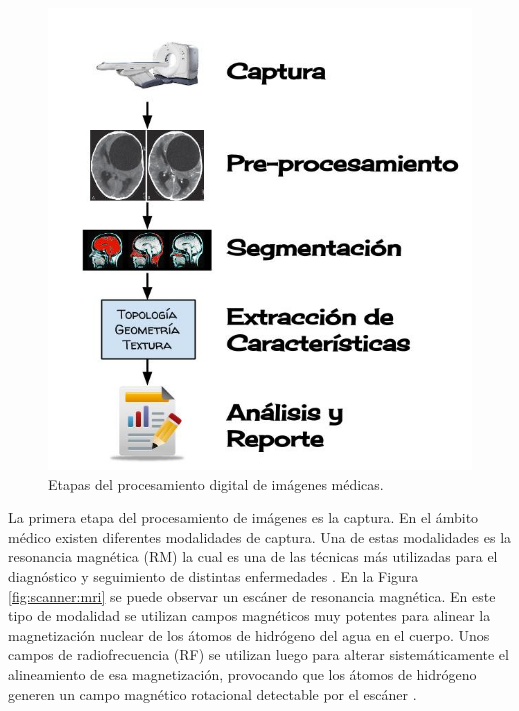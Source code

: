 \begin{figure}[H]
\centering
\includegraphics[scale=0.3]{images/Procesamiento_de_imagenes.jpg}
\caption{Etapas del procesamiento digital de imágenes médicas.}
\label{fig:etapas_del_procesamiento}
\end{figure}

La primera etapa del procesamiento de imágenes es la captura. En el ámbito médico existen diferentes modalidades de captura. Una de estas modalidades es la resonancia magnética (RM) la cual es una de las técnicas más utilizadas para el diagnóstico y seguimiento de distintas enfermedades \citep{prince2006medical}. En la Figura \ref{fig:scanner:mri} se puede observar un escáner de resonancia magnética.  En este tipo de modalidad se utilizan campos magnéticos muy potentes para alinear la magnetización nuclear de los átomos  de hidrógeno del agua en el cuerpo. Unos campos de radiofrecuencia (RF) se utilizan luego para alterar sistemáticamente el alineamiento de esa magnetización, provocando que los átomos de hidrógeno generen un campo magnético rotacional detectable por el escáner \citep{novelline2004squire}.

